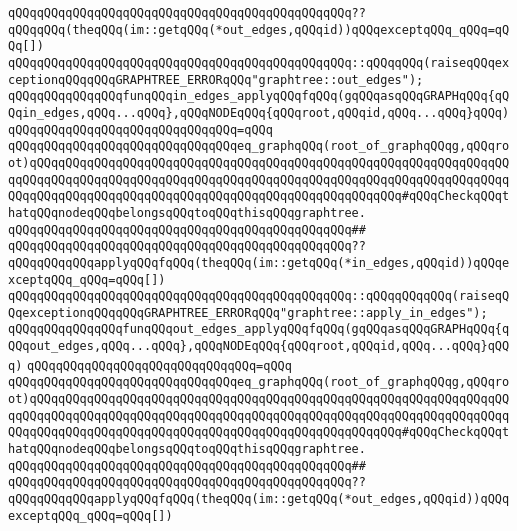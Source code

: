 \verb|qQQqqQQqqQQqqQQqqQQqqQQqqQQqqQQqqQQqqQQqqQQqqQQq??qQQqqQQq(theqQQq(im::getqQQq(*out_edges,qQQqid))qQQqexceptqQQq_qQQq=qQQq[])|\newline
\verb|qQQqqQQqqQQqqQQqqQQqqQQqqQQqqQQqqQQqqQQqqQQqqQQq::qQQqqQQq(raiseqQQqexceptionqQQqqQQqGRAPHTREE_ERRORqQQq"graphtree::out_edges");|\newline
\newline
\verb|qQQqqQQqqQQqqQQqfunqQQqin_edges_applyqQQqfqQQq(gqQQqasqQQqGRAPHqQQq{qQQqin_edges,qQQq...qQQq},qQQqNODEqQQq{qQQqroot,qQQqid,qQQq...qQQq}qQQq)|\newline
\verb|qQQqqQQqqQQqqQQqqQQqqQQqqQQqqQQq=qQQq|\newline
\verb|qQQqqQQqqQQqqQQqqQQqqQQqqQQqqQQqeq_graphqQQq(root_of_graphqQQqg,qQQqroot)qQQqqQQqqQQqqQQqqQQqqQQqqQQqqQQqqQQqqQQqqQQqqQQqqQQqqQQqqQQqqQQqqQQqqQQqqQQqqQQqqQQqqQQqqQQqqQQqqQQqqQQqqQQqqQQqqQQqqQQqqQQqqQQqqQQqqQQqqQQqqQQqqQQqqQQqqQQqqQQqqQQqqQQqqQQqqQQqqQQqqQQqqQQqqQQq#qQQqCheckqQQqthatqQQqnodeqQQqbelongsqQQqtoqQQqthisqQQqgraphtree.|\newline
\verb|qQQqqQQqqQQqqQQqqQQqqQQqqQQqqQQqqQQqqQQqqQQqqQQq##|\newline
\verb|qQQqqQQqqQQqqQQqqQQqqQQqqQQqqQQqqQQqqQQqqQQqqQQq??qQQqqQQqqQQqapplyqQQqfqQQq(theqQQq(im::getqQQq(*in_edges,qQQqid))qQQqexceptqQQq_qQQq=qQQq[])|\newline
\verb|qQQqqQQqqQQqqQQqqQQqqQQqqQQqqQQqqQQqqQQqqQQqqQQq::qQQqqQQqqQQq(raiseqQQqexceptionqQQqqQQqGRAPHTREE_ERRORqQQq"graphtree::apply_in_edges");|\newline
\newline
\verb|qQQqqQQqqQQqqQQqfunqQQqout_edges_applyqQQqfqQQq(gqQQqasqQQqGRAPHqQQq{qQQqout_edges,qQQq...qQQq},qQQqNODEqQQq{qQQqroot,qQQqid,qQQq...qQQq}qQQq)|\newline
\verb|qQQqqQQqqQQqqQQqqQQqqQQqqQQqqQQq=qQQq|\newline
\verb|qQQqqQQqqQQqqQQqqQQqqQQqqQQqqQQqeq_graphqQQq(root_of_graphqQQqg,qQQqroot)qQQqqQQqqQQqqQQqqQQqqQQqqQQqqQQqqQQqqQQqqQQqqQQqqQQqqQQqqQQqqQQqqQQqqQQqqQQqqQQqqQQqqQQqqQQqqQQqqQQqqQQqqQQqqQQqqQQqqQQqqQQqqQQqqQQqqQQqqQQqqQQqqQQqqQQqqQQqqQQqqQQqqQQqqQQqqQQqqQQqqQQqqQQqqQQq#qQQqCheckqQQqthatqQQqnodeqQQqbelongsqQQqtoqQQqthisqQQqgraphtree.|\newline
\verb|qQQqqQQqqQQqqQQqqQQqqQQqqQQqqQQqqQQqqQQqqQQqqQQq##|\newline
\verb|qQQqqQQqqQQqqQQqqQQqqQQqqQQqqQQqqQQqqQQqqQQqqQQq??qQQqqQQqqQQqapplyqQQqfqQQq(theqQQq(im::getqQQq(*out_edges,qQQqid))qQQqexceptqQQq_qQQq=qQQq[])|\newline
